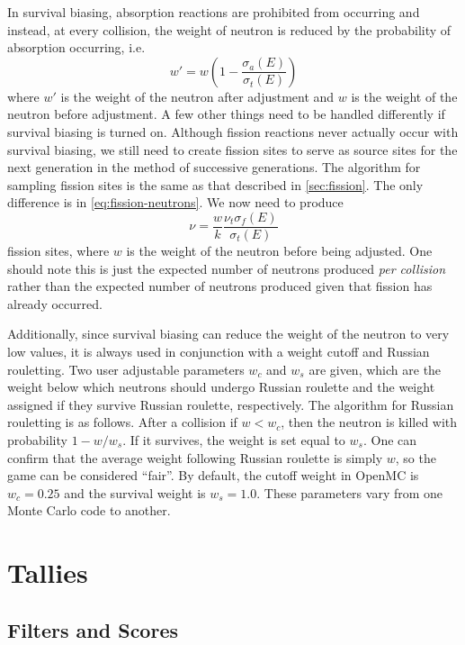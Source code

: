 In survival biasing, absorption reactions are prohibited from occurring and
instead, at every collision, the weight of neutron is reduced by the probability
of absorption occurring, i.e.
\begin{equation}
  \label{eq:survival-biasing-weight}
  w' = w \left ( 1 - \frac{\sigma_a (E)}{\sigma_t (E)} \right )
\end{equation}
where $w'$ is the weight of the neutron after adjustment and $w$ is the weight
of the neutron before adjustment. A few other things need to be handled
differently if survival biasing is turned on. Although fission reactions never
actually occur with survival biasing, we still need to create fission sites to
serve as source sites for the next generation in the method of successive
generations. The algorithm for sampling fission sites is the same as that
described in \autoref{sec:fission}. The only difference is in
\eqref{eq:fission-neutrons}. We now need to produce
\begin{equation}
  \label{eq:fission-neutrons-survival}
  \nu = \frac{w}{k} \frac{\nu_t \sigma_f(E)}{\sigma_t (E)}
\end{equation}
fission sites, where $w$ is the weight of the neutron before being adjusted. One
should note this is just the expected number of neutrons produced \emph{per
  collision} rather than the expected number of neutrons produced given that
fission has already occurred.

Additionally, since survival biasing can reduce the weight of the neutron to
very low values, it is always used in conjunction with a weight cutoff and
Russian rouletting. Two user adjustable parameters $w_c$ and $w_s$ are given,
which are the weight below which neutrons should undergo Russian roulette and
the weight assigned if they survive Russian roulette, respectively. The
algorithm for Russian rouletting is as follows. After a collision if $w < w_c$,
then the neutron is killed with probability $1 - w/w_s$. If it survives, the
weight is set equal to $w_s$. One can confirm that the average weight following
Russian roulette is simply $w$, so the game can be considered ``fair''. By
default, the cutoff weight in OpenMC is $w_c = 0.25$ and the survival weight is
$w_s = 1.0$. These parameters vary from one Monte Carlo code to another.

\section{Tallies}

\subsection{Filters and Scores}

